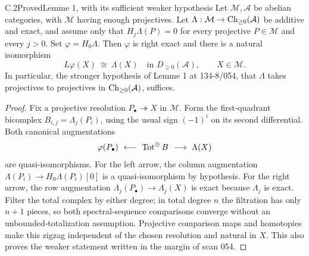 \begin{claim}{C.2}{Proved}{Lemme 1, with its sufficient weaker hypothesis}\label{C2}
Let $\mathcal M,\mathcal A$ be abelian categories, with $\mathcal M$ having enough projectives. Let $\Lambda:\mathcal M\to\operatorname{Ch}_{\geq0}(\mathcal A)$ be additive and exact, and assume only that $H_j\Lambda(P)=0$ for every projective $P\in\mathcal M$ and every $j>0$. Set $\varphi=H_0\Lambda$. Then $\varphi$ is right exact and there is a natural isomorphism
\[
 L\varphi(X)\ \cong\ \Lambda(X)
 \quad\text{in }D_{\geq0}(\mathcal A),\qquad X\in\mathcal M.
\]
In particular, the stronger hypothesis of Lemme 1 at 134-8/054, that $\Lambda$ takes projectives to projectives in $\operatorname{Ch}_{\geq0}(\mathcal A)$, suffices.
\end{claim}
\begin{proof}
Fix a projective resolution $P_\bullet\twoheadrightarrow X$ in $\mathcal M$. Form the first-quadrant bicomplex $B_{i,j}=\Lambda_j(P_i)$, using the usual sign $(-1)^i$ on its second differential. Both canonical augmentations
\[
 \varphi(P_\bullet)\ \longleftarrow\ \Tot^{\oplus}B\
 \longrightarrow\ \Lambda(X)
\]
are quasi-isomorphisms. For the left arrow, the column augmentation $\Lambda(P_i)\to H_0\Lambda(P_i)[0]$ is a quasi-isomorphism by hypothesis. For the right arrow, the row augmentation $\Lambda_j(P_\bullet)\to\Lambda_j(X)$ is exact because $\Lambda_j$ is exact. Filter the total complex by either degree; in total degree $n$ the filtration has only $n+1$ pieces, so both spectral-sequence comparisons converge without an unbounded-totalization assumption. Projective comparison maps and homotopies make this zigzag independent of the chosen resolution and natural in $X$. This also proves the weaker statement written in the margin of scan 054.
\end{proof}

